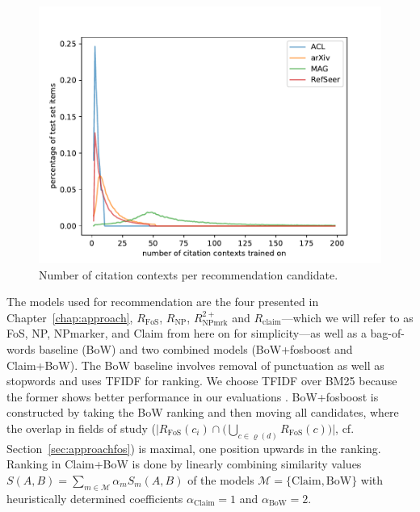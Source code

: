 \begin{figure}[tb]
  \centering
    \includegraphics[width=.8\textwidth]{figures/evaluation/comparison_contexts_per_cited_doc.pdf}
  \caption{Number of citation contexts per recommendation candidate.}
  \label{fig:evalcomp}
\end{figure}


The models used for recommendation are the four presented in Chapter~\ref{chap:approach}, ${R_{\text{FoS}}}$, ${R_{\text{NP}}}$, ${R_{\text{NPmrk}}^{2+}}$ and $R_{\text{claim}}$---which we will refer to as FoS, NP, NPmarker, and Claim from here on for simplicity---as well as a bag-of-words baseline (BoW) and two combined models (BoW+fosboost and Claim+BoW). The BoW baseline involves removal of punctuation as well as stopwords and uses TFIDF for ranking. We choose TFIDF over BM25 because the former shows better performance in our evaluations%
. BoW+fosboost is constructed by taking the BoW ranking and then moving all candidates, where the overlap in fields of study (${\big|R_{\text{FoS}}(c_i)\cap\big(\bigcup\limits_{c \in \varrho(d)} R_{\text{FoS}}(c)\big)\big|}$, cf. Section~\ref{sec:approachfos}) is maximal, one position upwards in the ranking. Ranking in Claim+BoW is done by linearly combining similarity values $S(A,B)=\sum\limits_{m\in\mathcal{M}}\alpha_mS_m(A,B)$ of the models $\mathcal{M}=\{\text{Claim},\text{BoW}\}$ with heuristically determined coefficients $\alpha_{\text{Claim}}=1$ and $\alpha_{\text{BoW}}=2$.

